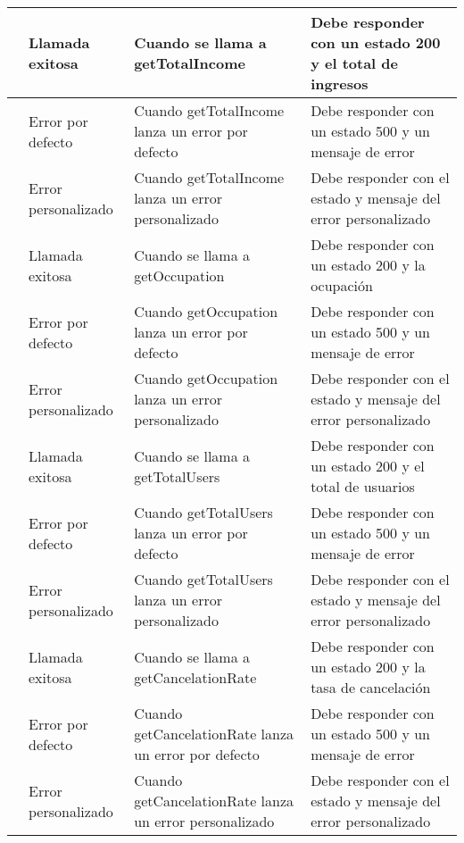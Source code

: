 \begin{small}
\begin{longtable}[H]{|>{\centering\arraybackslash}m{3cm}|>{\centering\arraybackslash}m{2cm}|>{\centering\arraybackslash}m{3cm}|>{\centering\arraybackslash}m{4cm}|}
		\multirow{3}{3cm}{GET /totalIncome}
		                 & Llamada exitosa       & Cuando se llama a getTotalIncome                            & Debe responder con un estado 200 y el total de ingresos        \\
		\cline{2-4}
		                 & Error por defecto     & Cuando getTotalIncome lanza un error por defecto            & Debe responder con un estado 500 y un mensaje de error         \\
		\cline{2-4}
		                 & Error personalizado   & Cuando getTotalIncome lanza un error personalizado          & Debe responder con el estado y mensaje del error personalizado \\
		\hline

		\multirow{3}{3cm}{GET /occupation}
		                 & Llamada exitosa       & Cuando se llama a getOccupation                             & Debe responder con un estado 200 y la ocupación                \\
		\cline{2-4}
		                 & Error por defecto     & Cuando getOccupation lanza un error por defecto             & Debe responder con un estado 500 y un mensaje de error         \\
		\cline{2-4}
		                 & Error personalizado   & Cuando getOccupation lanza un error personalizado           & Debe responder con el estado y mensaje del error personalizado \\
		\hline

		\multirow{3}{3cm}{GET /totalUsers}
		                 & Llamada exitosa       & Cuando se llama a getTotalUsers                             & Debe responder con un estado 200 y el total de usuarios        \\
		\cline{2-4}
		                 & Error por defecto     & Cuando getTotalUsers lanza un error por defecto             & Debe responder con un estado 500 y un mensaje de error         \\
		\cline{2-4}
		                 & Error personalizado   & Cuando getTotalUsers lanza un error personalizado           & Debe responder con el estado y mensaje del error personalizado \\
		\hline

		\multirow{3}{3cm}{GET /cancelationRate}
		                 & Llamada exitosa       & Cuando se llama a getCancelationRate                        & Debe responder con un estado 200 y la tasa de cancelación      \\
		\cline{2-4}
		                 & Error por defecto     & Cuando getCancelationRate lanza un error por defecto        & Debe responder con un estado 500 y un mensaje de error         \\
		\cline{2-4}
		                 & Error personalizado   & Cuando getCancelationRate lanza un error personalizado      & Debe responder con el estado y mensaje del error personalizado \\
		\hline


\end{longtable}
\end{small}
